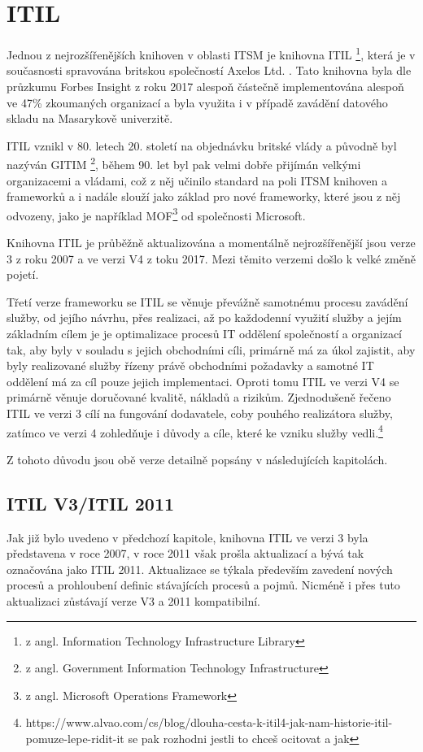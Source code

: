 \documentclass[
  digital,     %
  twoside,     %
  lof,         %
  lot,         %
]{fithesis4}
\begin{document}
\section{ITIL}
Jednou z nejrozšířenějších knihoven v oblasti ITSM je knihovna ITIL \footnote{z angl. Information Technology Infrastructure Library}, která je v současnosti spravována britskou společností Axelos Ltd. \parencite[s.~31]{Matula2017}. Tato knihovna byla dle průzkumu Forbes Insight z roku 2017 alespoň částečně implementována alespoň ve 47\% zkoumaných organizací\parencite{Watts3082017} a byla využita i v případě zavádění datového skladu na Masarykově univerzitě. 

ITIL vznikl v 80. letech 20. století na objednávku britské vlády a původně byl nazýván GITIM \footnote{z angl. Government Information Technology Infrastructure}, během 90. let byl pak velmi dobře přijímán velkými organizacemi a vládami, což z něj učinilo standard na poli ITSM knihoven a frameworků a i nadále slouží jako základ pro nové frameworky, které jsou z něj odvozeny, jako je například MOF\footnote{z angl. Microsoft Operations Framework} od společnosti Microsoft. \parencite[s. ~31]{Matula2017}

Knihovna ITIL je průběžně aktualizována a momentálně nejrozšířenější jsou verze 3 z roku 2007 a ve verzi V4 z toku 2017. Mezi těmito verzemi došlo k velké změně pojetí. 

Třetí verze frameworku se ITIL se věnuje převážně samotnému procesu zavádění služby, od jejího návrhu, přes realizaci, až po každodenní využití služby a jejím základním cílem je je optimalizace procesů IT oddělení společností a organizací tak, aby byly v souladu s jejich obchodními cíli, primárně má za úkol zajistit, aby byly realizované služby řízeny právě obchodními požadavky a samotné IT oddělení má za cíl pouze jejich implementaci.\parencite[s.~8]{Carlidge2007} Oproti tomu ITIL ve verzi V4 se primárně věnuje doručované kvalitě, nákladů a rizikům. Zjednodušeně řečeno ITIL ve verzi 3 cílí na fungování dodavatele, coby pouhého realizátora služby, zatímco ve verzi 4 zohledňuje i důvody a cíle, které ke vzniku služby vedli.\footnote{https://www.alvao.com/cs/blog/dlouha-cesta-k-itil4-jak-nam-historie-itil-pomuze-lepe-ridit-it se pak rozhodni jestli to chceš ocitovat a jak}

Z tohoto důvodu jsou obě verze detailně popsány v následujících kapitolách.  
\subsection{ITIL V3/ITIL 2011}
Jak již bylo uvedeno v předchozí kapitole, knihovna ITIL ve verzi 3 byla představena v roce 2007, v roce 2011 však prošla aktualizací a bývá tak označována jako ITIL 2011. Aktualizace se týkala především zavedení nových procesů a prohloubení definic stávajících procesů a pojmů. Nicméně i přes tuto aktualizaci zůstávají verze V3 a 2011 kompatibilní.\parencite{Kempter2722013}
\end{document}
